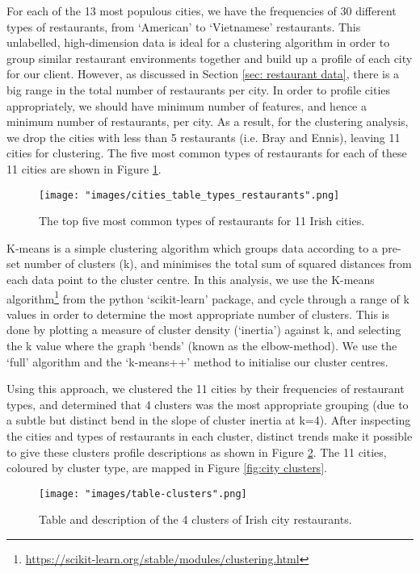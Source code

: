 \documentclass[a4paper,11pt]{article}
\begin{document}
For each of the 13 most populous cities, we have the frequencies of 30 different types of restaurants, from `American' to `Vietnamese' restaurants. This unlabelled, high-dimension data is ideal for a clustering algorithm in order to group similar restaurant environments together and build up a profile of each city for our client. However, as discussed in Section \ref{sec: restaurant data}, there is a big range in the total number of restaurants per city. In order to profile cities appropriately, we should have minimum number of features, and hence a minimum number of restaurants, per city. As a result, for the clustering analysis, we drop the cities with less than 5 restaurants (i.e. Bray and Ennis), leaving 11 cities for clustering. The five most common types of restaurants for each of these 11 cities are shown in Figure \ref{fig:5 common restaurants}.
%
\begin{figure}[htb]
   \centering
   \texttt{[image: "images/cities\_table\_types\_restaurants".png]}
      \caption{The top five most common types of restaurants for 11 Irish cities.}
      \label{fig:5 common restaurants}
\end{figure}
%

K-means is a simple clustering algorithm which groups data according to a pre-set number of clusters (k), and minimises the total sum of squared distances from each data point to the cluster centre. In this analysis, we use the K-means algorithm\footnote{\url{https://scikit-learn.org/stable/modules/clustering.html}} from the python `scikit-learn' package, and cycle through a range of k values in order to determine the most appropriate number of clusters. This is done by plotting a measure of cluster density (`inertia') against k, and selecting the k value where the graph `bends' (known as the elbow-method). We use the `full' algorithm and the `k-means++' method to initialise our cluster centres.

Using this approach, we clustered the 11 cities by their frequencies of restaurant types, and determined that 4 clusters was the most appropriate grouping (due to a subtle but distinct bend in the slope of cluster inertia at k=4). After inspecting the cities and types of restaurants in each cluster, distinct trends make it possible to give these clusters profile descriptions as shown in Figure \ref{fig:cluster table}. The 11 cities, coloured by cluster type, are mapped in Figure \ref{fig:city clusters}. 
%
\begin{figure}[H]
   \centering
   \texttt{[image: "images/table-clusters".png]}
      \caption{Table and description of the 4 clusters of Irish city restaurants.}
      \label{fig:cluster table}
\end{figure}
%
\end{document}
